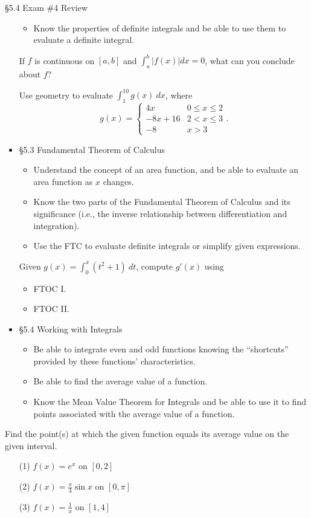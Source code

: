 \documentclass[cal1spr16Lectures.tex]{subfiles}
\begin{document}
\begin{frame}[allowframebreaks]{\S 5.4 Exam \#4 Review}
\begin{itemize}
\begin{itemize}
	\item Know the properties of definite integrals and be able to use them to evaluate a definite integral.
	\end{itemize}
\begin{que}
If $f$ is continuous on $[a,b]$ and $\int_a^b|f(x)|dx=0$, what can you conclude about $f$?
\end{que}	
\begin{exe}
Use geometry to evaluate $\int_1^{10}g(x)\ dx$, where
\[
g(x)=\begin{cases}
	4x & 0\leq x\leq 2 \\
	-8x+16 & 2<x\leq 3 \\
	-8 & x>3
	\end{cases}.
\]
\end{exe}
%
\framebreak	
\item \S 5.3 Fundamental Theorem of Calculus
	\begin{itemize}\footnotesize
	\item Understand the concept of an area function, and be able to evaluate an area function as $x$ changes.
	\item Know the two parts of the Fundamental Theorem of Calculus and its significance (i.e., the inverse relationship between differentiation and integration).
	\item Use the FTC to evaluate definite integrals or simplify given expressions.
	\end{itemize}
\begin{exe}
Given $g(x)=\int_0^x(t^2+1)\ dt$, compute $g'(x)$ using
\begin{itemize}
\item FTOC I.
\item FTOC II.
\end{itemize}
\end{exe}
\item \S 5.4 Working with Integrals
	\begin{itemize}\footnotesize
	\item Be able to integrate even and odd functions knowing the ``shortcuts'' provided by these functions' characteristics.
	\item Be able to find the average value of a function.
	\item Know the Mean Value Theorem for Integrals and be able to use it to find points associated with the average value of a function.
	\end{itemize}
\end{itemize}
\begin{exe}
Find the point(s) at which the given function equals its average value on the given interval.
\begin{itemize}
\item[(1)] $f(x)=e^x$ on $[0,2]$
\item[(2)] $f(x)=\frac{\pi}{4}\sin x$ on $[0,\pi]$
\item[(3)] $f(x)=\frac{1}{x}$ on $[1,4]$
\end{itemize}
\end{exe}
\end{frame}
\end{document}

